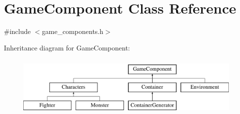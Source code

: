 \hypertarget{class_game_component}{}\section{Game\+Component Class Reference}
\label{class_game_component}


{\ttfamily \#include $<$game\+\_\+components.\+h$>$}

Inheritance diagram for Game\+Component\+:\begin{figure}[H]
\begin{center}
\leavevmode
\includegraphics[height=3.000000cm]{class_game_component}
\end{center}
\end{figure}
